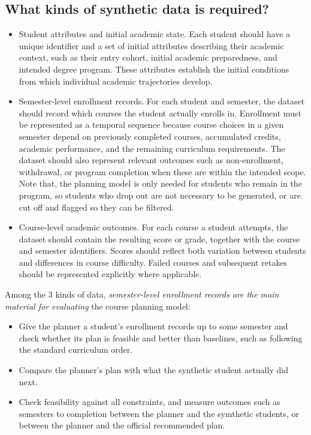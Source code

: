 \documentclass[10pt,a4paper]{article}
\begin{document}
    \subsection{What kinds of synthetic data is required?}
\begin{itemize}
      \item Student attributes and initial academic state. Each student should have a unique identifier and a set of initial attributes describing their academic context, such as their entry cohort, initial academic preparedness, and intended degree program. These attributes establish the initial conditions from which individual academic trajectories develop. 
      \item Semester-level enrollment records. For each student and semester, the dataset should record which courses the student actually enrolls in. Enrollment must be represented as a temporal sequence because course choices in a given semester depend on previously completed courses, accumulated credits, academic performance, and the remaining curriculum requirements. The dataset should also represent relevant outcomes such as non-enrollment, withdrawal, or program completion when these are within the intended scope. Note that, the planning model is only needed for students who remain in the program, so students who drop out are not necessary to be generated, or are cut off and flagged so they can be filtered.
      \item Course-level academic outcomes. For each course a student attempts, the dataset should contain the resulting score or grade, together with the course and semester identifiers. Scores should reflect both variation between students and differences in course difficulty. Failed courses and subsequent retakes should be represented explicitly where applicable.
\end{itemize}

Among the 3 kinds of data, \textit{semester-level enrollment records are the main material for evaluating} the course planning model: 
\begin{itemize}
    \item Give the planner a student’s enrollment records up to some semester and check whether its plan is feasible and better than baselines, such as following the standard curriculum order.
    \item Compare the planner’s plan with what the synthetic student actually did next.
    \item Check feasibility against all constraints, and measure outcomes such as semesters to completion between the planner and the symthetic students, or between the planner and the official recommended plan.
\end{itemize}
\end{document}
